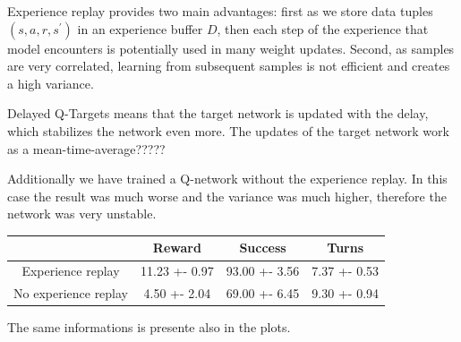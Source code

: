 \documentclass[12pt,titlepage,a4paper]{article}
\begin{document}
Experience replay provides two main advantages: first as we store data tuples $(s, a, r, s^\prime)$ in an experience buffer $D$, then each step of the experience that model encounters is potentially used in many weight updates. Second, as samples are very correlated, learning from subsequent samples is not efficient and creates a high variance.

Delayed Q-Targets means that the target network is updated with the delay, which stabilizes the network even more. The updates of the target network work as a mean-time-average?????

Additionally we have trained a Q-network without the experience replay. In this case the result was much worse and the variance was much higher, therefore the network was very unstable.

\begin{center}
    \begin{tabular}{||c c c c||} 
     \hline
      & Reward & Success & Turns \\ [0.5ex] 
     \hline\hline
     Experience replay & 11.23 +- 0.97 & 93.00 +- 3.56 & 7.37 +- 0.53 \\ 
     \hline
     No experience replay & 4.50 +- 2.04 & 69.00 +- 6.45 & 9.30 +- 0.94 \\
     \hline
    \end{tabular}
\end{center}

The same informations is presente also in the plots.
\end{document}
